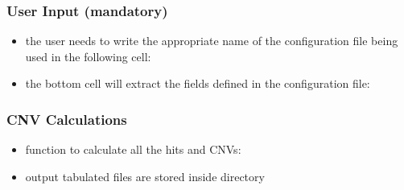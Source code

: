 \documentclass[letterpaper,10pt,english]{sphinxhowto}
\begin{document}
\subsubsection{User Input (mandatory)}
\label{\detokenize{index:user-input-mandatory}}\begin{itemize}
\item {} 
\sphinxAtStartPar
the user needs to write the appropriate name of the configuration file being used in the following cell:

\end{itemize}

\begin{sphinxVerbatim}[commandchars=\\\{\}]
 \PYG{p}{[} \PYG{p}{]}   
\end{sphinxVerbatim}
\begin{itemize}
\item {} 
\sphinxAtStartPar
the bottom cell will extract the fields defined in the configuration file:

\end{itemize}

\begin{sphinxVerbatim}[commandchars=\\\{\}]
 \PYG{p}{[} \PYG{p}{]}   
\end{sphinxVerbatim}


\subsubsection{CNV Calculations}
\label{\detokenize{index:cnv-calculations}}\begin{itemize}
\item {} 
\sphinxAtStartPar
function to calculate all the hits and CNVs:

\end{itemize}

\begin{sphinxVerbatim}[commandchars=\\\{\}]
 \PYG{p}{[} \PYG{p}{]} 
\end{sphinxVerbatim}
\begin{itemize}
\item {} 
\sphinxAtStartPar
output tabulated files are stored inside  directory

\end{itemize}
\end{document}
